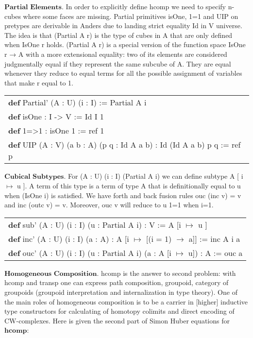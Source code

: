 \documentclass[a4paper,UKenglish,cleveref, autoref, thm-restate]{lipics-v2021}
\newcommand{\tabstyle}[0]{\scriptsize\ttfamily\fontseries{l}\selectfont}
\begin{document}
\newpage
$\textbf{Partial\ Elements}$. In order to explicitly define hcomp we need to specify
n-cubes where some faces are missing. Partial primitives isOne, 1=1 and UIP on pretypes
are derivable in Anders due to landing strict equality Id in V universe. The idea is
that (Partial A r) is the type of cubes in A that are only defined when IsOne r holds.
(Partial A r) is a special version of the function space IsOne r → A with a more
extensional equality: two of its elements are considered judgmentally equal if
they represent the same subcube of A. They are equal whenever they reduce to
equal terms for all the possible assignment of variables that make r equal to 1.

\begin{table}[ht]
\tabstyle
\begin{tabular}{l}
\textbf{def} Partial' (A : U) (i : I) := Partial A i \\
\textbf{def} isOne : I -> V := Id I 1 \\
\textbf{def} 1=>1 : isOne 1 := ref 1 \\
\textbf{def} UIP (A : V) (a b : A) (p q : Id A a b) : Id (Id A a b) p q := ref p \\
\end{tabular}
\end{table}

$\textbf{Cubical\ Subtypes}$. For (A : U) (i : I) (Partial A i) we can define
subtype A [ i $\mapsto$ u ]. A term of this type is a term of type A that is
definitionally equal to u when (IsOne i) is satisfied. We have forth and back
fusion rules ouc (inc v) = v and inc (outc v) = v. Moreover, ouc v will reduce to u 1=1 when i=1.

\begin{table}[ht]
\tabstyle
\begin{tabular}{l}
\textbf{def} sub' (A : U) (i : I) (u : Partial A i) : V := A [i $\mapsto$ u ] \\
\textbf{def} inc' (A : U) (i : I) (a : A) : A [i $\mapsto$ [(i = 1) $\rightarrow$ a]] := inc A i a \\
\textbf{def} ouc' (A : U) (i : I) (u : Partial A i) (a : A [i $\mapsto$ u]) : A := ouc a \\
\end{tabular}
\end{table}

$\textbf{Homogeneous\ Composition}$. hcomp is the answer to second problem: with hcomp and transp
one can express path composition, groupoid, category of groupoids (groupoid interpretation and
internalization in type theory). One of the main roles of homogeneous composition is to be a
carrier in [higher] inductive type constructors for calculating of homotopy colimits and direct
encoding of CW-complexes. Here is given the second part of Simon Huber equations \cite{Huber} for $\textbf{hcomp}$:
\end{document}

